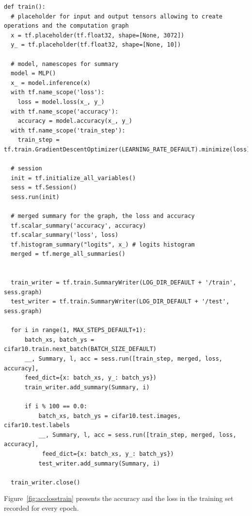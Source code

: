 \documentclass{article}
\begin{document}
\begin{small}
\begin{verbatim}
def train():
  # placeholder for input and output tensors allowing to create operations and the computation graph
  x = tf.placeholder(tf.float32, shape=[None, 3072])
  y_ = tf.placeholder(tf.float32, shape=[None, 10])
  
  # model, namescopes for summary
  model = MLP()
  x_ = model.inference(x)
  with tf.name_scope('loss'):
    loss = model.loss(x_, y_)
  with tf.name_scope('accuracy'):
    accuracy = model.accuracy(x_, y_)
  with tf.name_scope('train_step'):
    train_step = tf.train.GradientDescentOptimizer(LEARNING_RATE_DEFAULT).minimize(loss)
  
  # session
  init = tf.initialize_all_variables()
  sess = tf.Session()
  sess.run(init)

  # merged summary for the graph, the loss and accuracy
  tf.scalar_summary('accuracy', accuracy)
  tf.scalar_summary('loss', loss)
  tf.histogram_summary("logits", x_) # logits histogram
  merged = tf.merge_all_summaries()


  train_writer = tf.train.SummaryWriter(LOG_DIR_DEFAULT + '/train', sess.graph)
  test_writer = tf.train.SummaryWriter(LOG_DIR_DEFAULT + '/test', sess.graph)

  for i in range(1, MAX_STEPS_DEFAULT+1):
      batch_xs, batch_ys = cifar10.train.next_batch(BATCH_SIZE_DEFAULT)
      __, Summary, l, acc = sess.run([train_step, merged, loss, accuracy],
      feed_dict={x: batch_xs, y_: batch_ys})
      train_writer.add_summary(Summary, i)

      if i % 100 == 0.0:
          batch_xs, batch_ys = cifar10.test.images, cifar10.test.labels
          __, Summary, l, acc = sess.run([train_step, merged, loss, accuracy],
           feed_dict={x: batch_xs, y_: batch_ys})
          test_writer.add_summary(Summary, i)

  train_writer.close()
\end{verbatim}
\end{small}

Figure~\ref{fig:acclosstrain} presents the accuracy and the loss in the training set recorded for every epoch.
\end{document}
